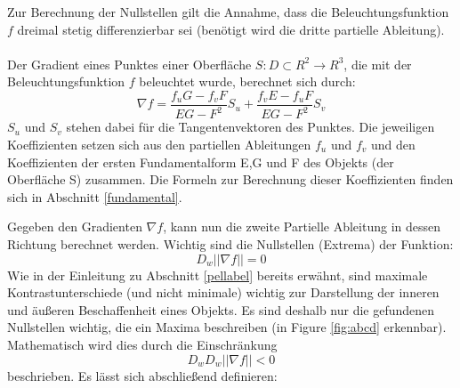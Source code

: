 \documentclass{paperStyle}
\begin{document}
Zur Berechnung der Nullstellen gilt die Annahme, dass die Beleuchtungsfunktion $f$ dreimal stetig differenzierbar sei (benötigt wird die dritte partielle Ableitung). \\\\
Der Gradient eines Punktes einer Oberfläche $S : D \subset R^{2} \longrightarrow R^{3}$, die mit der Beleuchtungsfunktion $f$ beleuchtet wurde, berechnet sich durch:
\begin{equation}
\nabla f = \frac{ f_{ u }G - f_{ v }F }{EG - F^{ 2 }  }S_{ u } + \frac{ f_{ v }E - f_{ u }F }{EG - F^{ 2 } } S_{ v }
	\label{eq:gradientf}
\end{equation}
$S_{ u } $ und $S_{ v }$ stehen dabei für die Tangentenvektoren des Punktes. Die jeweiligen Koeffizienten setzen sich aus den partiellen Ableitungen $f_{ u }$ und $f_{ v }$ und den Koeffizienten der ersten Fundamentalform E,G und F des Objekts (der Oberfläche S) zusammen. Die Formeln zur Berechnung dieser Koeffizienten finden sich in Abschnitt \ref{fundamental}.

Gegeben den Gradienten $\nabla f$, kann nun die zweite Partielle Ableitung in dessen Richtung berechnet werden. Wichtig sind die Nullstellen (Extrema) der Funktion:
\begin{equation}
D_{w}||\nabla f || = 0
	\label{eq:dw}
\end{equation}
Wie in der Einleitung zu Abschnitt \ref{pellabel} bereits erwähnt, sind maximale Kontrastunterschiede (und nicht minimale) wichtig zur Darstellung der inneren und äußeren Beschaffenheit eines Objekts. Es sind deshalb nur die gefundenen Nullstellen wichtig, die ein Maxima beschreiben (in Figure \ref{fig:abcd} erkennbar). Mathematisch wird dies durch die Einschränkung
\begin{equation}
D_{w}D_{w}||\nabla f || < 0
\label{eq:dwdw}
\end{equation}
beschrieben. Es lässt sich abschließend definieren:
\end{document}
